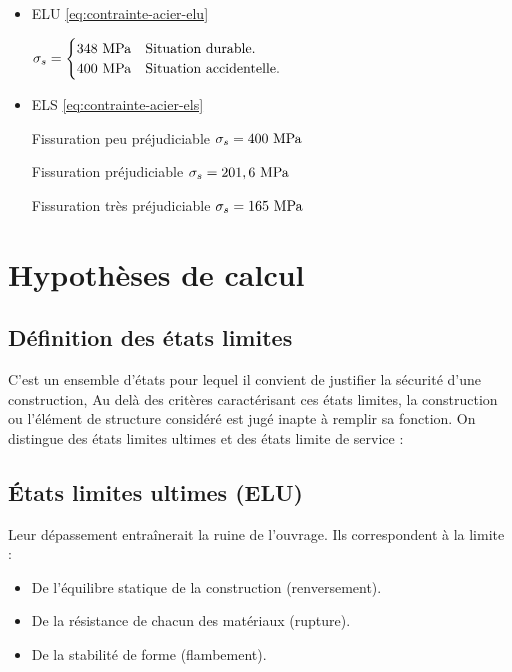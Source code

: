 \documentclass[12pt,a4paper]{report}
\numberwithin{equation}{section}
\newcommand{\sgma}[1]{\sigma_{#1}}
\begin{document}
	\begin{itemize}
		\item ELU \eqref{eq:contrainte-acier-elu}
		
		\subitem $\sgma{s} = \begin{cases}
			348\mpa \quad\text{Situation durable.}\\
			400\mpa \quad\text{Situation accidentelle.}
		\end{cases}$
		
		\item ELS \eqref{eq:contrainte-acier-els}
		
		\subitem Fissuration peu préjudiciable $\sgma{s} = 400\mpa$
		
		\subitem Fissuration préjudiciable $\sgma{s} = 201,6\mpa$
		
		\subitem Fissuration très préjudiciable $\sgma{s} = 165\mpa$
		
	\end{itemize}
	
	
	
	
	\section{Hypothèses de calcul}
	
	\subsection{Définition des états limites}
	
	C'est un ensemble d'états pour lequel il convient de justifier la sécurité d'une construction, Au delà des critères caractérisant ces états limites, la construction ou l'élément de structure considéré est jugé inapte à remplir sa fonction. On distingue des états limites ultimes et des états limite de service :
	
	\subsection{États limites ultimes (ELU)}
	
	Leur dépassement entraînerait la ruine de l'ouvrage. Ils correspondent à la limite :
	
	\begin{itemize}
		\item De l'équilibre statique de la construction (renversement).
		\item De la résistance de chacun des matériaux (rupture).
		\item De la stabilité de forme (flambement).
	\end{itemize}
	
\end{document}
